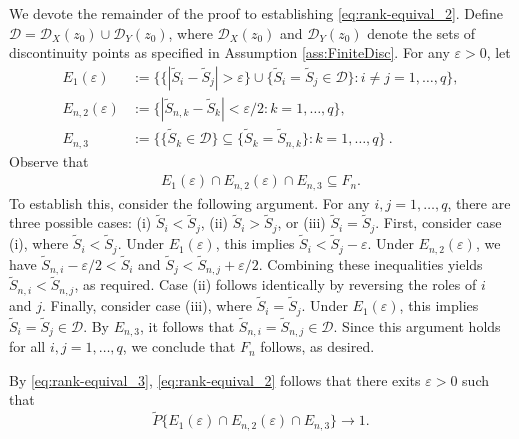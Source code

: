 \documentclass[11pt]{article}
\numberwithin{equation}{section}
\begin{document}
We devote the remainder of the proof to establishing \eqref{eq:rank-equival_2}. Define \(\mathcal{D} = \mathcal{D}_{X}(z_{0}) \cup \mathcal{D}_{Y}(z_{0})\), where \(\mathcal{D}_{X}(z_{0})\) and \(\mathcal{D}_{Y}(z_{0})\) denote the sets of discontinuity points as specified in Assumption \ref{ass:FiniteDisc}. For any \(\varepsilon > 0\), let  
\begin{align*}
    E_{1}(\varepsilon) &:= \big\{ \{ |\tilde{S}_{i} - \tilde{S}_{j}| > \varepsilon \} \cup \{ \tilde{S}_{i} = \tilde{S}_{j} \in \mathcal{D} \} : i \neq j = 1, \dots, q \big\}, \\
    E_{n,2}(\varepsilon) & := \big\{ |\tilde{S}_{n,k} - \tilde{S}_{k}| < \varepsilon /2 : k = 1, \dots, q \big\}, \\
    E_{n,3} & := \big\{ \{ \tilde{S}_{k} \in \mathcal{D} \} \subseteq \{ \tilde{S}_{k} = \tilde{S}_{n,k} \} : k = 1, \dots, q \big\}~.
\end{align*}
Observe that  
\begin{align}\label{eq:rank-equival_3}
    E_{1}(\varepsilon) \cap E_{n,2}(\varepsilon) \cap E_{n,3} \subseteq F_{n}. 
\end{align}
To establish this, consider the following argument. For any \(i,j = 1, \dots, q\), there are three possible cases:  
(i) \(\tilde{S}_{i} < \tilde{S}_{j}\),  
(ii) \(\tilde{S}_{i} > \tilde{S}_{j}\), or  
(iii) \(\tilde{S}_{i} = \tilde{S}_{j}\). 
First, consider case (i), where \(\tilde{S}_{i} < \tilde{S}_{j}\). Under \(E_{1}(\varepsilon)\), this implies \(\tilde{S}_{i} < \tilde{S}_{j} - \varepsilon\). Under \(E_{n,2}(\varepsilon)\), we have \(\tilde{S}_{n,i} - \varepsilon/2 < \tilde{S}_{i}\) and \(\tilde{S}_{j} < \tilde{S}_{n,j} + \varepsilon/2\). Combining these inequalities yields \(\tilde{S}_{n,i} < \tilde{S}_{n,j}\), as required. Case (ii) follows identically by reversing the roles of \(i\) and \(j\). Finally, consider case (iii), where \(\tilde{S}_{i} = \tilde{S}_{j}\). Under \(E_{1}(\varepsilon)\), this implies \(\tilde{S}_{i} = \tilde{S}_{j} \in \mathcal{D}\). By \(E_{n,3}\), it follows that \(\tilde{S}_{n,i} = \tilde{S}_{n,j} \in \mathcal{D}\). Since this argument holds for all \(i, j = 1, \dots, q\), we conclude that \(F_{n}\) follows, as desired.

By \eqref{eq:rank-equival_3}, \eqref{eq:rank-equival_2} follows that there exits $\varepsilon >0$ such that
\begin{equation}
\tilde{P}\{E_{1}(\varepsilon) \cap E_{n,2}(\varepsilon) \cap E_{n,3}\}\to 1. \label{eq:rank-equival_4}
\end{equation}
\end{document}
